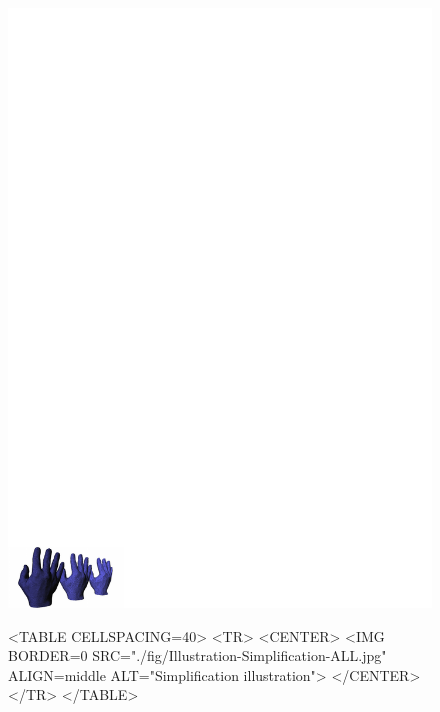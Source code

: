
\begin{figure}[htbp]
\begin{ccTexOnly}
\begin{center}
\includegraphics[width=17cm]{Surface_mesh_simplification/fig/Illustration-Simplification-ALL} %
\end{center}
\end{ccTexOnly}
\begin{ccHtmlOnly}
<TABLE CELLSPACING=40>
<TR>
<CENTER>
<IMG BORDER=0 SRC="./fig/Illustration-Simplification-ALL.jpg" ALIGN=middle ALT="Simplification illustration">
</CENTER>
</TR>
</TABLE>
\end{ccHtmlOnly}
\end{figure}

